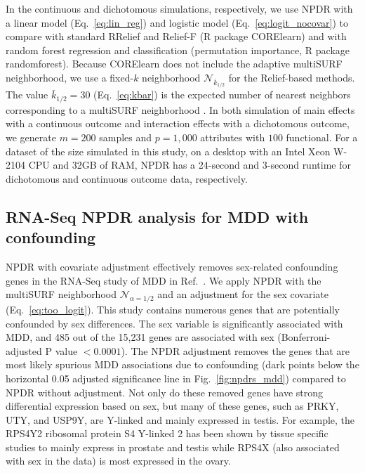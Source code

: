 \documentclass[10pt]{article}
\begin{document}
In the continuous and dichotomous simulations, respectively, we use NPDR with a linear model (Eq.~\ref{eq:lin_reg}) and logistic model (Eq.~\ref{eq:logit_nocovar}) to compare with standard RRelief and Relief-F (R package CORElearn) and with random forest regression and classification (permutation importance, R package randomforest). Because CORElearn does not include the adaptive multiSURF neighborhood, we use a fixed-$k$ neighborhood $\mathcal{N}_{\bar{k}_{1/2}}$ for the Relief-based methods.
The value $\bar{k}_{1/2}=30$ (Eq.~\ref{eq:kbar}) is the expected number of nearest neighbors corresponding to a multiSURF neighborhood \cite{bod}. In both simulation of main effects with a continuous outcome and interaction effects with a dichotomous outcome, we generate $m = 200$ samples and $p = 1,000$ attributes with $100$ functional. For a dataset of the size simulated in this study, on a desktop with an Intel Xeon W-2104 CPU and 32GB of RAM, NPDR has a 24-second and 3-second runtime for dichotomous and continuous outcome data, respectively.

\subsection{RNA-Seq NPDR analysis for MDD with confounding}
NPDR with covariate adjustment effectively removes sex-related confounding genes in the RNA-Seq study of MDD in Ref.~\cite{mostafavi14}. We apply NPDR with the multiSURF neighborhood $\mathcal{N}_{\alpha=1/2}$ and an adjustment for the sex covariate (Eq.~\ref{eq:too_logit}).
This study contains numerous genes that are potentially confounded by sex differences. The sex variable is significantly associated with MDD, and 485 out of the 15,231 genes are associated with sex (Bonferroni-adjusted P value $<0.0001$). 
The NPDR adjustment removes the genes that are most likely spurious MDD associations due to confounding (dark points below the horizontal 0.05 adjusted significance line in Fig.~\ref{fig:npdrs_mdd}) compared to NPDR without adjustment. 
Not only do these removed genes have strong differential expression based on sex, but many of these genes, such as PRKY, UTY, and USP9Y, are Y-linked and mainly expressed in testis. For example, the RPS4Y2 ribosomal protein S4 Y-linked 2 has been shown by tissue specific studies to mainly express in prostate and testis \cite{lopes2010human} while RPS4X (also associated with sex in the data) is most expressed in the ovary. 
\end{document}
